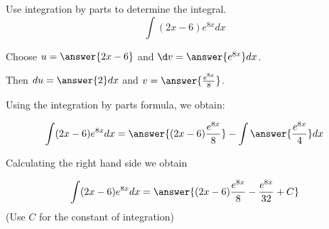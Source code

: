 \documentclass{ximera}
\author{Jason Miller}
\begin{document}
\begin{exercise}
Use integration by parts to determine the integral.
\[
\int (2x-6) e^{8x} dx 
\]


Choose $u=\answer{ 2x-6}$ and $\d v=\answer{e^{8x} } dx$. 

Then $du= \answer{ 2 } dx$ and $v= \answer{ \frac{e^{8x}}{8} }$.

Using the integration by parts formula, we obtain:

\[
\int (2x-6)e^{8x} dx= \answer{(2x-6)\frac{e^{8x}}{8}} - \int \answer{ \frac{e^{8x}}{4} } dx
\]

Calculating the right hand side we obtain

\[
\int (2x-6)e^{8x} dx= \answer{ (2x-6)\frac{e^{8x}}{8} - \frac{e^{8x}}{32} +C}
\]
(Use $C$ for the constant of integration)

\end{exercise}
\end{document}
